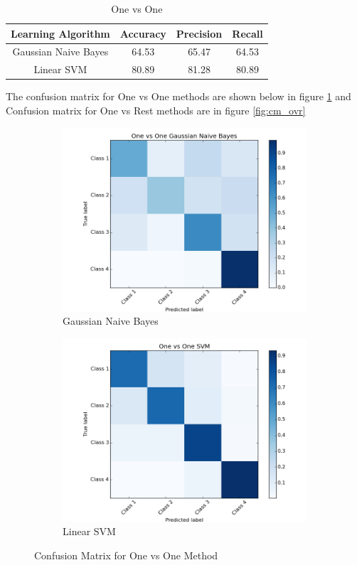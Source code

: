 \documentclass[11pt]{article}
\begin{document}
\begin{table}[h]
	\centering
	\begin{tabular}{|c|c|c|c|} \hline
		Learning Algorithm & Accuracy & Precision & Recall\\ \hline
		Gaussian Naive Bayes & 64.53 & 65.47 & 64.53 \\
		Linear SVM & 80.89 & 81.28 & 80.89 \\
		\hline
	\end{tabular}
	\caption{One vs One}
	\label{table:ovo_res}
\end{table}

\newpage
The confusion matrix for One vs One methods are shown below in figure \ref{fig:cm_ovo} and Confusion matrix for One vs Rest methods are in figure \ref{fig:cm_ovr}

\begin{figure}[h]
	
	\begin{subfigure}[b]{0.5\textwidth}
		\includegraphics[width=\textwidth]{ovo_gnb.png}
		\caption{Gaussian Naive Bayes}
	\end{subfigure}
	\begin{subfigure}[b]{0.5\textwidth}
		\includegraphics[width=\textwidth]{ovo_svm.png}
		\caption{Linear SVM}
	\end{subfigure}
	\caption{Confusion Matrix for One vs One Method}
	\label{fig:cm_ovo}
\end{figure}
\end{document}
